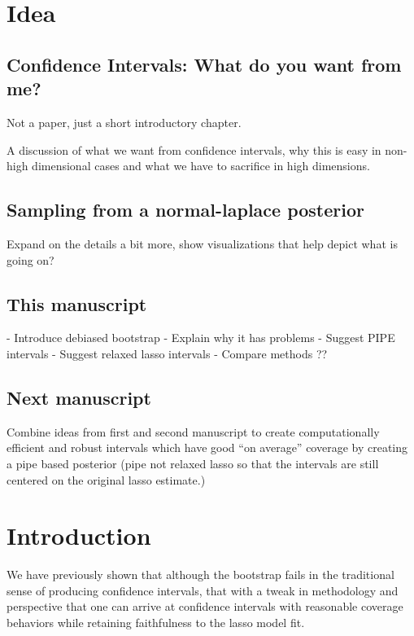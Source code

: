 \section{Idea}

\subsection{Confidence Intervals: What do you want from me?}

Not a paper, just a short introductory chapter.

A discussion of what we want from confidence intervals, why this is easy in non-high dimensional cases and what we have to sacrifice in high dimensions.

\subsection{Sampling from a normal-laplace posterior}

Expand on the details a bit more, show visualizations that help depict what is going on?

\subsection{This manuscript}

- Introduce debiased bootstrap
- Explain why it has problems
- Suggest PIPE intervals
- Suggest relaxed lasso intervals
- Compare methods ??

\subsection{Next manuscript}

Combine ideas from first and second manuscript to create computationally efficient and robust intervals which have good ``on average'' coverage by creating a pipe based posterior (pipe not relaxed lasso so that the intervals are still centered on the original lasso estimate.)

\section{Introduction}

We have previously shown that although the bootstrap fails in the traditional sense of producing confidence intervals, that with a tweak in methodology and perspective that one can arrive at confidence intervals with reasonable coverage behaviors while retaining faithfulness to the lasso model fit. 

